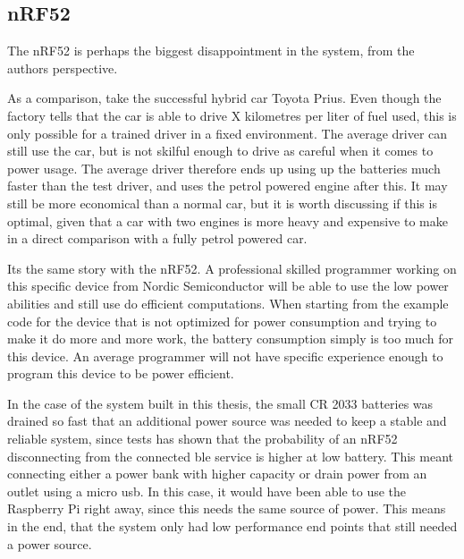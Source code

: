 \subsection{nRF52}

The nRF52 is perhaps the biggest disappointment in the system, from the authors perspective. 


As a comparison, take the successful hybrid car Toyota Prius. Even though the factory tells that the car is able to drive X kilometres per liter of fuel used, this is only possible for a trained driver in a fixed environment. The average driver can still use the car, but is not skilful enough to drive as careful when it comes to power usage. The average driver therefore ends up using up the batteries much faster than the test driver, and uses the petrol powered engine after this. It may still be more economical than a normal car, but it is worth discussing if this is optimal, given that a car with two engines is more heavy and expensive to make in a direct comparison with a fully petrol powered car. 

Its the same story with the nRF52. A professional skilled programmer working on this specific device from Nordic Semiconductor will be able to use the low power abilities and still use do efficient computations. When starting from the example code for the device that is not optimized for power consumption and trying to make it do more and more work, the battery consumption simply is too much for this device. An average programmer will not have specific experience enough to program this device to be power efficient. 

In the case of the system built in this thesis, the small CR 2033 batteries was drained so fast that an additional power source was needed to keep a stable and reliable system, since tests has shown that the probability of an nRF52 disconnecting from the connected \gls{ble} service is higher at low battery. This meant connecting either a power bank with higher capacity or drain power from an outlet using a micro \gls{usb}. In this case, it would have been able to use the Raspberry Pi right away, since this needs the same source of power. This means in the end, that the system only had low performance end points that still needed a power source. 




